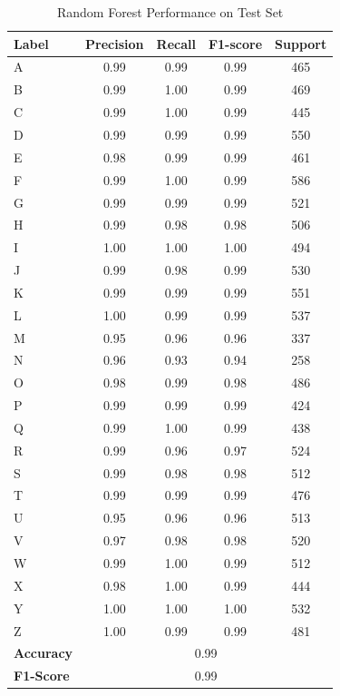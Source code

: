 \begin{table}[H]
\centering
\small
\renewcommand{\arraystretch}{1.2}
\setlength{\tabcolsep}{10pt}
\caption{Random Forest Performance on Test Set}
\begin{tabular}{|p{2cm}|cccc|}
\hline
\textbf{Label}& \textbf{Precision} & \textbf{Recall} & \textbf{F1-score} & \textbf{Support} \\
\hline
A & 0.99 & 0.99 & 0.99 & 465 \\
B & 0.99 & 1.00 & 0.99 & 469 \\
C & 0.99 & 1.00 & 0.99 & 445 \\
D & 0.99 & 0.99 & 0.99 & 550 \\
E & 0.98 & 0.99 & 0.99 & 461 \\
F & 0.99 & 1.00 & 0.99 & 586 \\
G & 0.99 & 0.99 & 0.99 & 521 \\
H & 0.99 & 0.98 & 0.98 & 506 \\
I & 1.00 & 1.00 & 1.00 & 494 \\
J & 0.99 & 0.98 & 0.99 & 530 \\
K & 0.99 & 0.99 & 0.99 & 551 \\
L & 1.00 & 0.99 & 0.99 & 537 \\
M & 0.95 & 0.96 & 0.96 & 337 \\
N & 0.96 & 0.93 & 0.94 & 258 \\
O & 0.98 & 0.99 & 0.98 & 486 \\
P & 0.99 & 0.99 & 0.99 & 424 \\
Q & 0.99 & 1.00 & 0.99 & 438 \\
R & 0.99 & 0.96 & 0.97 & 524 \\
S & 0.99 & 0.98 & 0.98 & 512 \\
T & 0.99 & 0.99 & 0.99 & 476 \\
U & 0.95 & 0.96 & 0.96 & 513 \\
V & 0.97 & 0.98 & 0.98 & 520 \\
W & 0.99 & 1.00 & 0.99 & 512 \\
X & 0.98 & 1.00 & 0.99 & 444 \\
Y & 1.00 & 1.00 & 1.00 & 532 \\
Z & 1.00 & 0.99 & 0.99 & 481 \\
\hline
\textbf{Accuracy} & \multicolumn{4}{|c|}{0.99} \\
\textbf{F1-Score} & \multicolumn{4}{|c|}{0.99}  \\
\hline
\end{tabular}
\end{table}



